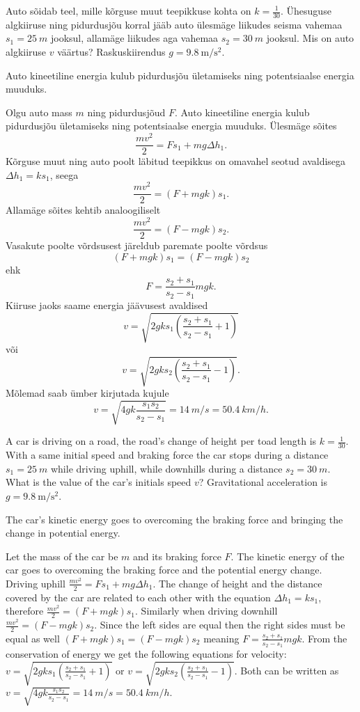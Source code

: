 
Auto sõidab teel, mille kõrguse muut teepikkuse kohta on $k=\frac{1}{30}$. Ühesuguse algkiiruse ning pidurdusjõu korral jääb auto ülesmäge liikudes seisma vahemaa $s_1=\SI{25}{m}$ jooksul, allamäge liikudes aga vahemaa $s_2=\SI{30}{m}$ jooksul. Mis on auto algkiiruse $v$ väärtus? Raskuskiirendus $g=\SI{9.8}{\meter\per\second\squared}$.

\hint
Auto kineetiline energia kulub pidurdusjõu ületamiseks ning potentsiaalse energia muuduks.

\solu
Olgu auto mass $m$ ning pidurdusjõud $F$. Auto kineetiline energia kulub pidurdusjõu ületamiseks ning potentsiaalse energia muuduks. Ülesmäge sõites
\[
\frac{mv^2}{2}=Fs_1+mg\Delta h_1.
\]
Kõrguse muut ning auto poolt läbitud teepikkus on omavahel seotud avaldisega $\Delta h_1=ks_1$, seega
\[
\frac{mv^2}{2}=\left(F+mgk\right)s_1.
\]
Allamäge sõites kehtib analoogiliselt
\[
\frac{mv^2}{2}=\left(F-mgk\right)s_2.
\]
Vasakute poolte võrdsusest järeldub paremate poolte võrdsus 
\[
\left(F+mgk\right)s_1=\left(F-mgk\right)s_2
\]
ehk
\[
F=\frac{s_2+s_1}{s_2-s_1}mgk.
\]
Kiiruse jaoks saame energia jäävusest avaldised 
\[
v=\sqrt{2gks_1\left(\frac{s_2+s_1}{s_2-s_1}+1\right)}
\]
või
\[
v=\sqrt{2gks_2\left(\frac{s_2+s_1}{s_2-s_1}-1\right)}.
\]
Mõlemad saab ümber kirjutada kujule 
\[
v=\sqrt{4gk\frac{s_1s_2}{s_2-s_1}}=\SI{14}{m \per s}=\SI{50.4}{km \per h}.
\]

A car is driving on a road, the road’s change of height per toad length is $k=\frac{1}{30}$. With a same initial speed and braking force the car stops during a distance $s_1=\SI{25}{m}$ while driving uphill, while downhills during a distance $s_2=\SI{30}{m}$. What is the value of the car’s initials speed $v$? Gravitational acceleration is $g=\SI{9.8}{\meter\per\second\squared}$.

\hinteng
The car’s kinetic energy goes to overcoming the braking force and bringing the change in potential energy.

\solueng
Let the mass of the car be $m$ and its braking force $F$. The kinetic energy of the car goes to overcoming the braking force and the potential energy change. Driving uphill $\frac{mv^2}{2}=Fs_1+mg\Delta h_1$. The change of height and the distance covered by the car are related to each other with the equation $\Delta h_1=ks_1$, therefore $\frac{mv^2}{2}=\left(F+mgk\right)s_1$. Similarly when driving downhill $\frac{mv^2}{2}=\left(F-mgk\right)s_2$. Since the left sides are equal then the right sides must be equal as well $\left(F+mgk\right)s_1=\left(F-mgk\right)s_2$ meaning $F=\frac{s_2+s_1}{s_2-s_1}mgk$. From the conservation of energy we get the following equations for velocity: $v=\sqrt{2gks_1\left(\frac{s_2+s_1}{s_2-s_1}+1\right)}$ or $v=\sqrt{2gks_2\left(\frac{s_2+s_1}{s_2-s_1}-1\right)}$. Both can be written as $v=\sqrt{4gk\frac{s_1s_2}{s_2-s_1}}=\SI{14}{m \per s}=\SI{50.4}{km \per h}$.
\probend